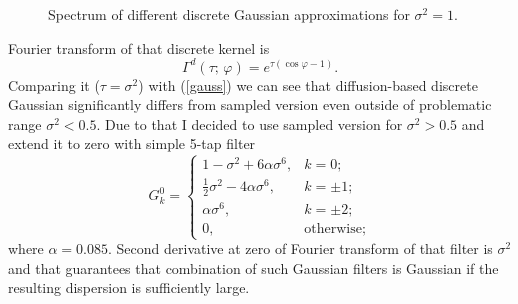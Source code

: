 \documentclass[10pt]{article}
\begin{document}
\begin{wrapfigure}{r}{0pt}
    \caption{Spectrum of different discrete Gaussian approximations for $\sigma^2 = 1$.}
\end{wrapfigure}

Fourier transform of that discrete kernel is
\begin{equation}
    \Gamma^d(\tau;\,\varphi) = e^{\tau(\cos\varphi - 1)}.
\end{equation}
Comparing it ($\tau = \sigma^2$) with (\ref{gauss}) we can see that diffusion-based discrete
Gaussian significantly differs from sampled version even outside of problematic range
$\sigma^2 < 0.5$. Due to that I decided to use sampled version for $\sigma^2 > 0.5$ and extend it
to zero with simple 5-tap filter
\begin{equation}
    G^0_k = \left\{
        \begin{array}{ll}
            1 - \sigma^2 + 6\alpha\sigma^6,& k = 0;\\
            \frac12\sigma^2 - 4\alpha\sigma^6,& k = \pm1;\\
            \alpha\sigma^6,& k = \pm2;\\
            0,& \text{otherwise};
        \end{array}
    \right.
\end{equation}
where $\alpha = 0.085$. Second derivative at zero of Fourier transform of that filter is $\sigma^2$
and that guarantees that combination of such Gaussian filters is Gaussian if the resulting
dispersion is sufficiently large.
\end{document}
